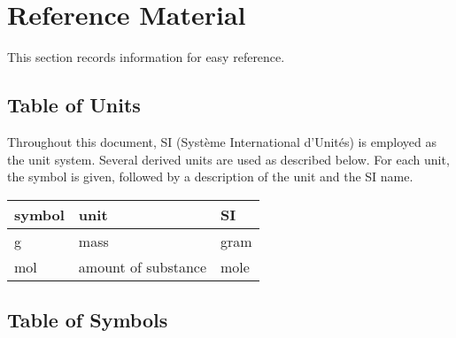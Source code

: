 \documentclass[12pt]{article}
\begin{document}

\section{Reference Material} \label{sec_refMat}

This section records information for easy reference.

\subsection{Table of Units} \label{sec_ToU}

Throughout this document, SI (Syst\`{e}me International d'Unit\'{e}s) is employed
as the unit system.
Several derived units are
used as described below.  For each unit, the symbol is given, followed by a
description of the unit and the SI name.
~\newline

\renewcommand{\arraystretch}{1.2}
\noindent \begin{tabular}{l l l}
  \toprule
  \textbf{symbol} & \textbf{unit}       & \textbf{SI} \\
  \midrule
  \si{\gram}      & mass                & gram        \\
  \si{\mole}      & amount of substance & mole        \\
  \bottomrule
\end{tabular}


\subsection{Table of Symbols} \label{sec_tabSymbs}
\end{document}
